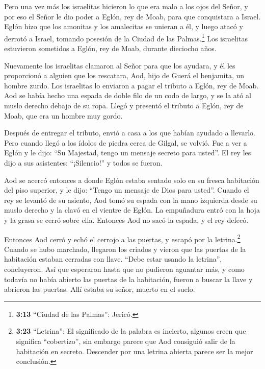  Pero una vez más los israelitas hicieron lo que era malo a
los ojos del Señor, y por eso el Señor le dio poder a Eglón, rey de
Moab, para que conquistara a Israel.  Eglón hizo que los
amonitas y los amalecitas se unieran a él, y luego atacó y derrotó a
Israel, tomando posesión de la Ciudad de las Palmas.\footnote{\textbf{3:13}
  ``Ciudad de las Palmas'': Jericó.}  Los israelitas
estuvieron sometidos a Eglón, rey de Moab, durante dieciocho años.

 Nuevamente los israelitas clamaron al Señor para que los
ayudara, y él les proporcionó a alguien que los rescatara, Aod, hijo de
Guerá el benjamita, un hombre zurdo. Los israelitas lo enviaron a pagar
el tributo a Eglón, rey de Moab.  Aod se había hecho una
espada de doble filo de un codo de largo, y se la ató al muslo derecho
debajo de su ropa.  Llegó y presentó el tributo a Eglón,
rey de Moab, que era un hombre muy gordo.

 Después de entregar el tributo, envió a casa a los que
habían ayudado a llevarlo.  Pero cuando llegó a los ídolos
de piedra cerca de Gilgal, se volvió. Fue a ver a Eglón y le dijo: ``Su
Majestad, tengo un mensaje secreto para usted''. El rey les dijo a sus
asistentes: ``¡Silencio!'' y todos se fueron.

 Aod se acercó entonces a donde Eglón estaba sentado solo
en su fresca habitación del piso superior, y le dijo: ``Tengo un mensaje
de Dios para usted''. Cuando el rey se levantó de su asiento,
 Aod tomó su espada con la mano izquierda desde su muslo
derecho y la clavó en el vientre de Eglón.  La empuñadura
entró con la hoja y la grasa se cerró sobre ella. Entonces Aod no sacó
la espada, y el rey defecó.

 Entonces Aod cerró y echó el cerrojo a las puertas, y
escapó por la letrina.\footnote{\textbf{3:23} ``Letrina'': El
  significado de la palabra es incierto, algunos creen que significa
  ``cobertizo'', sin embargo parece que Aod consiguió salir de la
  habitación en secreto. Descender por una letrina abierta parece ser la
  mejor conclusión.}  Cuando se hubo marchado, llegaron los
criados y vieron que las puertas de la habitación estaban cerradas con
llave. ``Debe estar usando la letrina'', concluyeron.  Así
que esperaron hasta que no pudieron aguantar más, y como todavía no
había abierto las puertas de la habitación, fueron a buscar la llave y
abrieron las puertas. Allí estaba su señor, muerto en el suelo.


